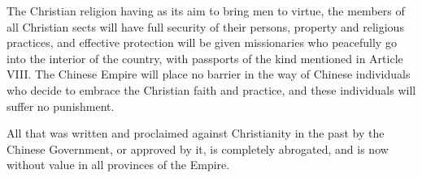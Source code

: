 \begin{fancyquote}
	The Christian religion having as its aim to bring men to virtue, the members of all Christian sects will have full security of their persons, property and religious practices, and effective protection will be given missionaries who peacefully go into the interior of the country, with passports of the kind mentioned in Article VIII. The Chinese Empire will place no barrier in the way of Chinese individuals who decide to embrace the Christian faith and practice, and these individuals will suffer no punishment.

	All that was written and proclaimed against Christianity in the past by the Chinese Government, or approved by it, is completely abrogated, and is now without value in all provinces of the Empire. \emph{\autocite{Chassiron:1861}}
\end{fancyquote}
